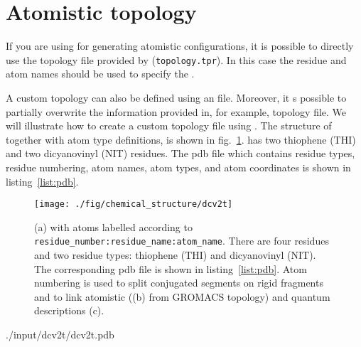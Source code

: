 \section{Atomistic topology}
\label{sec:atomistic}

If you are using \gromacs for generating atomistic configurations, it is 
possible to directly use the topology file provided by \gromacs 
(\texttt{topology.tpr}). In this case the \gromacs residue and atom names should 
be used to specify the . 

A custom topology can also be defined using an \xml file. Moreover, it s 
possible to partially overwrite the information provided in, for example, 
\gromacs topology file. We will illustrate how to create a custom topology file 
using . The structure of  together with atom type definitions, is 
shown in fig.~\ref{fig:dcv2t}. has two thiophene (THI) and two 
dicyanovinyl (NIT) residues. The pdb file which contains residue types, residue 
numbering, atom names, atom types, and atom coordinates is shown in 
listing~\ref{list:pdb}.

\begin{figure}[ht]
\centering
\texttt{[image: ./fig/chemical\_structure/dcv2t]}
\caption{\small (a)  with atoms labelled according to 
\texttt{residue\_number:residue\_name:atom\_name}. 
There are four residues and two residue types: thiophene (THI) and dicyanovinyl 
(NIT). The corresponding pdb file is shown in listing~\ref{list:pdb}. 
Atom numbering is used to split conjugated segments on rigid fragments and to 
link atomistic ((b) from GROMACS topology) and quantum descriptions (c).}
\label{fig:dcv2t}
\end{figure}

%
{./input/dcv2t/dcv2t.pdb}
\vfill